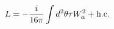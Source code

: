 \begin{equation}
L = -\frac{i}{16\pi}\int d^2 \theta \tau W_{\alpha}^2 +{\rm h.c.}
\label{eq111}
\end{equation}

